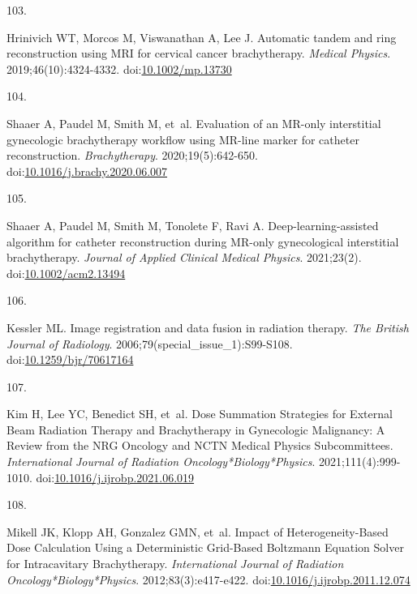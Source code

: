 \documentclass[
  a4paper,
]{scrreprt}
\newlength{\cslhangindent}
\newlength{\csllabelwidth}
\newlength{\cslentryspacingunit} %
\newenvironment{CSLReferences}[2] %
 {%
  \setlength{\parindent}{0pt}
  \ifodd #1
  \let\oldpar\par
  \def\par{\hangindent=\cslhangindent\oldpar}
  \fi
  \setlength{\parskip}{#2\cslentryspacingunit}
 }%
 {}
\newcommand{\CSLLeftMargin}[1]{\parbox[t]{\csllabelwidth}{#1}}
\newcommand{\CSLRightInline}[1]{\parbox[t]{\linewidth - \csllabelwidth}{#1}\break}
\begin{document}
\begin{CSLReferences}{0}{0}
\leavevmode{}%
\CSLLeftMargin{103. }%
\CSLRightInline{Hrinivich WT, Morcos M, Viswanathan A, Lee J. Automatic
tandem and ring reconstruction using MRI for cervical cancer
brachytherapy. \emph{Medical Physics}. 2019;46(10):4324-4332.
doi:\href{https://doi.org/10.1002/mp.13730}{10.1002/mp.13730}}

\leavevmode{}%
\CSLLeftMargin{104. }%
\CSLRightInline{Shaaer A, Paudel M, Smith M, et~al. Evaluation of an
MR-only interstitial gynecologic brachytherapy workflow using MR-line
marker for catheter reconstruction. \emph{Brachytherapy}.
2020;19(5):642-650.
doi:\href{https://doi.org/10.1016/j.brachy.2020.06.007}{10.1016/j.brachy.2020.06.007}}

\leavevmode{}%
\CSLLeftMargin{105. }%
\CSLRightInline{Shaaer A, Paudel M, Smith M, Tonolete F, Ravi A.
Deep{-}learning{-}assisted algorithm for catheter reconstruction during
MR{-}only gynecological interstitial brachytherapy. \emph{Journal of
Applied Clinical Medical Physics}. 2021;23(2).
doi:\href{https://doi.org/10.1002/acm2.13494}{10.1002/acm2.13494}}

\leavevmode{}%
\CSLLeftMargin{106. }%
\CSLRightInline{Kessler ML. Image registration and data fusion in
radiation therapy. \emph{The British Journal of Radiology}.
2006;79(special{\_}issue{\_}1):S99-S108.
doi:\href{https://doi.org/10.1259/bjr/70617164}{10.1259/bjr/70617164}}

\leavevmode{}%
\CSLLeftMargin{107. }%
\CSLRightInline{Kim H, Lee YC, Benedict SH, et~al. Dose Summation
Strategies for External Beam Radiation Therapy and Brachytherapy in
Gynecologic Malignancy: A Review from the NRG Oncology and NCTN Medical
Physics Subcommittees. \emph{International Journal of Radiation
Oncology*Biology*Physics}. 2021;111(4):999-1010.
doi:\href{https://doi.org/10.1016/j.ijrobp.2021.06.019}{10.1016/j.ijrobp.2021.06.019}}

\leavevmode{}%
\CSLLeftMargin{108. }%
\CSLRightInline{Mikell JK, Klopp AH, Gonzalez GMN, et~al. Impact of
Heterogeneity-Based Dose Calculation Using a Deterministic Grid-Based
Boltzmann Equation Solver for Intracavitary Brachytherapy.
\emph{International Journal of Radiation Oncology*Biology*Physics}.
2012;83(3):e417-e422.
doi:\href{https://doi.org/10.1016/j.ijrobp.2011.12.074}{10.1016/j.ijrobp.2011.12.074}}


\end{CSLReferences}
\end{document}
